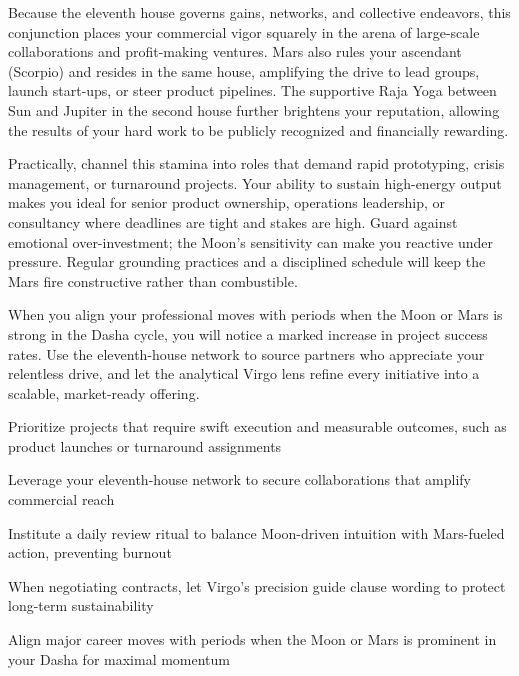{\fontsize{9}{13}\selectfont Because the eleventh house governs gains, networks, and collective endeavors, this conjunction places your commercial vigor squarely in the arena of large-scale collaborations and profit-making ventures. Mars also rules your ascendant (Scorpio) and resides in the same house, amplifying the drive to lead groups, launch start-ups, or steer product pipelines. The supportive Raja Yoga between Sun and Jupiter in the second house further brightens your reputation, allowing the results of your hard work to be publicly recognized and financially rewarding.}\par\vspace{1.8mm}

{\fontsize{9}{13}\selectfont Practically, channel this stamina into roles that demand rapid prototyping, crisis management, or turnaround projects. Your ability to sustain high-energy output makes you ideal for senior product ownership, operations leadership, or consultancy where deadlines are tight and stakes are high. Guard against emotional over-investment; the Moon's sensitivity can make you reactive under pressure. Regular grounding practices and a disciplined schedule will keep the Mars fire constructive rather than combustible.}\par\vspace{1.8mm}

{\fontsize{9}{13}\selectfont When you align your professional moves with periods when the Moon or Mars is strong in the Dasha cycle, you will notice a marked increase in project success rates. Use the eleventh-house network to source partners who appreciate your relentless drive, and let the analytical Virgo lens refine every initiative into a scalable, market-ready offering.}\par\vspace{1.8mm}

\begin{diamondlist}
  \item {\fontsize{8.5}{12}\selectfont Prioritize projects that require swift execution and measurable outcomes, such as product launches or turnaround assignments}
  \item {\fontsize{8.5}{12}\selectfont Leverage your eleventh-house network to secure collaborations that amplify commercial reach}
  \item {\fontsize{8.5}{12}\selectfont Institute a daily review ritual to balance Moon-driven intuition with Mars-fueled action, preventing burnout}
  \item {\fontsize{8.5}{12}\selectfont When negotiating contracts, let Virgo's precision guide clause wording to protect long-term sustainability}
  \item {\fontsize{8.5}{12}\selectfont Align major career moves with periods when the Moon or Mars is prominent in your Dasha for maximal momentum}
\end{diamondlist}

